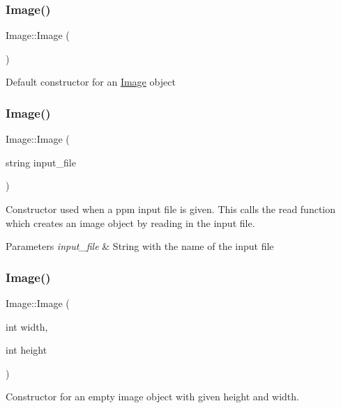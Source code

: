 \subsubsection{\texorpdfstring{Image()}{Image()}\hspace{0.1cm}{\footnotesize\ttfamily [1/3]}}
{\footnotesize\ttfamily Image\+::\+Image (\begin{DoxyParamCaption}{ }\end{DoxyParamCaption})}

Default constructor for an \hyperlink{class_image}{Image} object \mbox{\label{class_image_af2d2b2b46060ce7d4dda966d1bb29b45}} 
\subsubsection{\texorpdfstring{Image()}{Image()}\hspace{0.1cm}{\footnotesize\ttfamily [2/3]}}
{\footnotesize\ttfamily Image\+::\+Image (\begin{DoxyParamCaption}\item[{string}]{input\+\_\+file }\end{DoxyParamCaption})}

Constructor used when a ppm input file is given. This calls the read function which creates an image object by reading in the input file.


\begin{DoxyParams}{Parameters}
{\em input\+\_\+file} & String with the name of the input file \\
\hline
\end{DoxyParams}
\mbox{\label{class_image_afb0339b802ed560e69eb07358d30198f}} 
\subsubsection{\texorpdfstring{Image()}{Image()}\hspace{0.1cm}{\footnotesize\ttfamily [3/3]}}
{\footnotesize\ttfamily Image\+::\+Image (\begin{DoxyParamCaption}\item[{int}]{width,  }\item[{int}]{height }\end{DoxyParamCaption})}

Constructor for an empty image object with given height and width.


